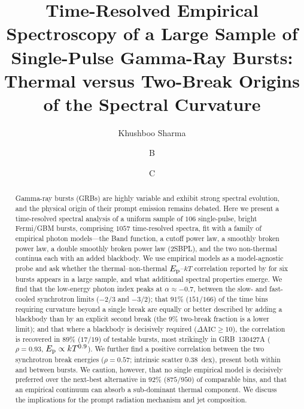 \documentclass[twocolumn]{aastex631}
\newcommand{\Ep}{\ensuremath{E_{\rm p}}}
\newcommand{\kT}{\ensuremath{kT}}
\begin{document}
\title{Time-Resolved Empirical Spectroscopy of a Large Sample of Single-Pulse
Gamma-Ray Bursts: Thermal versus Two-Break Origins of the Spectral Curvature}

\author{Khushboo Sharma}
\author{B}
\author{C}

\begin{abstract}
Gamma-ray bursts (GRBs) are highly variable and exhibit strong spectral
evolution, and the physical origin of their prompt emission remains debated.
Here we present a time-resolved spectral analysis of a uniform sample of
$106$ single-pulse, bright Fermi/GBM bursts, comprising $1057$
time-resolved spectra, fit with a family of empirical photon models---the Band
function, a cutoff power law, a smoothly broken power law, a double smoothly
broken power law (2SBPL), and the two non-thermal continua each with an added
blackbody. We use empirical models as a model-agnostic probe and ask whether the
thermal--non-thermal $\Ep$--$\kT$ correlation reported by \citet{Burgess2014a}
for six bursts appears in a large sample, and what additional spectral properties
emerge. We find that the low-energy photon index peaks at $\alpha\approx-0.7$,
between the slow- and fast-cooled synchrotron limits ($-2/3$ and $-3/2$); that
$91\%$ ($151/166$) of the time bins requiring curvature beyond a single break are
equally or better described by adding a blackbody than by an explicit
second break (the $9\%$ two-break fraction is a lower limit); and that where a
blackbody is decisively required ($\Delta\mathrm{AIC}\ge10$), the
\citet{Burgess2014a} correlation is recovered in $89\%$ ($17/19$) of testable
bursts, most strikingly in GRB~130427A ($\rho=0.93$, $\Ep\propto\kT^{0.9}$).
We further find a positive correlation between the two synchrotron break
energies ($\rho=0.57$; intrinsic scatter $0.38$~dex), present both within and
between bursts. We caution, however, that no single empirical model is decisively
preferred over the next-best alternative in $92\%$ ($875/950$) of comparable
bins, and that an empirical continuum can absorb a sub-dominant thermal
component. We discuss the implications for the prompt radiation mechanism and
jet composition.
\end{abstract}

\end{document}
